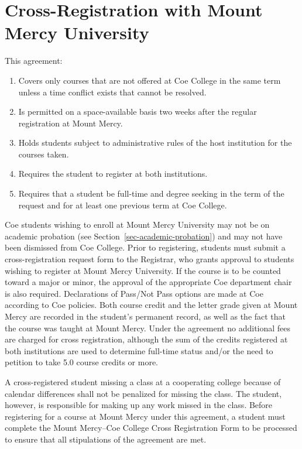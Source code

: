\documentclass[
  letterpaper,
]{scrbook}
\providecommand{\tightlist}{%
  \setlength{\itemsep}{0pt}\setlength{\parskip}{0pt}}
\begin{document}
\section{Cross-Registration with Mount Mercy
University}\label{cross-registration-with-mount-mercy-university}

This agreement:

\begin{enumerate}
\def\labelenumi{\arabic{enumi}.}
\tightlist
\item
  Covers only courses that are not offered at Coe College in the same
  term unless a time conflict exists that cannot be resolved.
\item
  Is permitted on a space-available basis two weeks after the regular
  registration at Mount Mercy.
\item
  Holds students subject to administrative rules of the host institution
  for the courses taken.
\item
  Requires the student to register at both institutions.
\item
  Requires that a student be full-time and degree seeking in the term of
  the request and for at least one previous term at Coe College.
\end{enumerate}

Coe students wishing to enroll at Mount Mercy University may not be on
academic probation (see Section~\ref{sec-academic-probation}) and may
not have been dismissed from Coe College. Prior to registering, students
must submit a cross-registration request form to the Registrar, who
grants approval to students wishing to register at Mount Mercy
University. If the course is to be counted toward a major or minor, the
approval of the appropriate Coe department chair is also required.
Declarations of Pass/Not Pass options are made at Coe according to Coe
policies. Both course credit and the letter grade given at Mount Mercy
are recorded in the student's permanent record, as well as the fact that
the course was taught at Mount Mercy. Under the agreement no additional
fees are charged for cross registration, although the sum of the credits
registered at both institutions are used to determine full-time status
and/or the need to petition to take 5.0 course credits or more.

A cross-registered student missing a class at a cooperating college
because of calendar differences shall not be penalized for missing the
class. The student, however, is responsible for making up any work
missed in the class. Before registering for a course at Mount Mercy
under this agreement, a student must complete the Mount Mercy--Coe
College Cross Registration Form to be processed to ensure that all
stipulations of the agreement are met.
\end{document}
